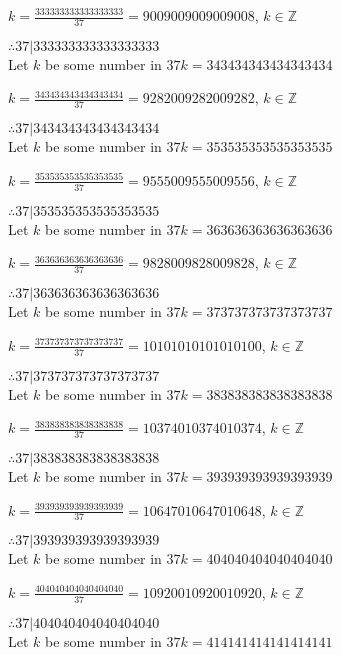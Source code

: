 \documentclass{article}
\begin{document}
$k = \frac{333333333333333333}{37} = 9009009009009008$, $k \in \mathbb{Z}$

$ \therefore  37|333333333333333333 $ \\

Let $k$ be some number in $37k = 343434343434343434$

$k = \frac{343434343434343434}{37} = 9282009282009282$, $k \in \mathbb{Z}$

$ \therefore  37|343434343434343434 $ \\

Let $k$ be some number in $37k = 353535353535353535$

$k = \frac{353535353535353535}{37} = 9555009555009556$, $k \in \mathbb{Z}$

$ \therefore  37|353535353535353535 $ \\

Let $k$ be some number in $37k = 363636363636363636$

$k = \frac{363636363636363636}{37} = 9828009828009828$, $k \in \mathbb{Z}$

$ \therefore  37|363636363636363636 $ \\

Let $k$ be some number in $37k = 373737373737373737$

$k = \frac{373737373737373737}{37} = 10101010101010100$, $k \in \mathbb{Z}$

$ \therefore  37|373737373737373737 $ \\

Let $k$ be some number in $37k = 383838383838383838$

$k = \frac{383838383838383838}{37} = 10374010374010374$, $k \in \mathbb{Z}$

$ \therefore  37|383838383838383838 $ \\

Let $k$ be some number in $37k = 393939393939393939$

$k = \frac{393939393939393939}{37} = 10647010647010648$, $k \in \mathbb{Z}$

$ \therefore  37|393939393939393939 $ \\

Let $k$ be some number in $37k = 404040404040404040$

$k = \frac{404040404040404040}{37} = 10920010920010920$, $k \in \mathbb{Z}$

$ \therefore  37|404040404040404040 $ \\

Let $k$ be some number in $37k = 414141414141414141$
\end{document}
